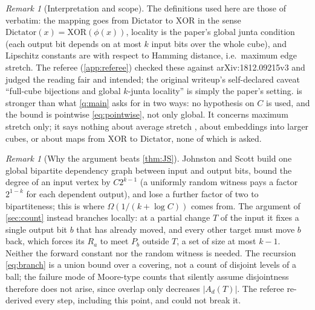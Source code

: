 \documentclass[11pt,a4paper]{article}
\theoremstyle{plain}
\theoremstyle{definition}
\theoremstyle{remark}
\newtheorem{remark}[theorem]{Remark}
\newcommand{\Dict}{\mathrm{Dictator}}
\newcommand{\XOR}{\mathrm{XOR}}
\begin{document}
\begin{remark}[Interpretation and scope]
The definitions used here are those of \cite{JS21} verbatim: the mapping goes from $\Dict$ to $\XOR$ in the sense $\Dict(x)=\XOR(\phi(x))$, locality is the paper's global junta condition (each output bit depends on at most $k$ input bits over the whole cube), and Lipschitz constants are with respect to Hamming distance, i.e.\ maximum edge stretch. The referee (\cref{app:referee}) checked these against arXiv:1812.09215v3 and judged the reading fair and intended; the original writeup's self-declared caveat ``full-cube bijections and global $k$-junta locality'' is simply the paper's setting.  is stronger than what \cref{q:main} asks for in two ways: no hypothesis on $C$ is used, and the bound is pointwise \eqref{eq:pointwise}, not only global. It concerns maximum stretch only; it says nothing about average stretch \cite{BS23}, about embeddings into larger cubes, or about maps from $\XOR$ to $\Dict$, none of which is asked.
\end{remark}

\begin{remark}[Why the argument beats \cref{thm:JS}]
Johnston and Scott build one global bipartite dependency graph between input and output bits, bound the degree of an input vertex by $C2^{k-1}$ (a uniformly random witness pays a factor $2^{1-k}$ for each dependent output), and lose a further factor of two to bipartiteness; this is where $\Omega(1/(k+\log C))$ comes from. The argument of \cref{sec:count} instead branches locally: at a partial change $T$ of the input it fixes a single output bit $b$ that has already moved, and every other target must move $b$ back, which forces its $R_a$ to meet $P_b$ outside $T$, a set of size at most $k-1$. Neither the forward constant nor the random witness is needed. The recursion \eqref{eq:branch} is a union bound over a covering, not a count of disjoint levels of a ball; the failure mode of Moore-type counts that silently assume disjointness therefore does not arise, since overlap only decreases $|A_d(T)|$. The referee re-derived every step, including this point, and could not break it.
\end{remark}
\end{document}
